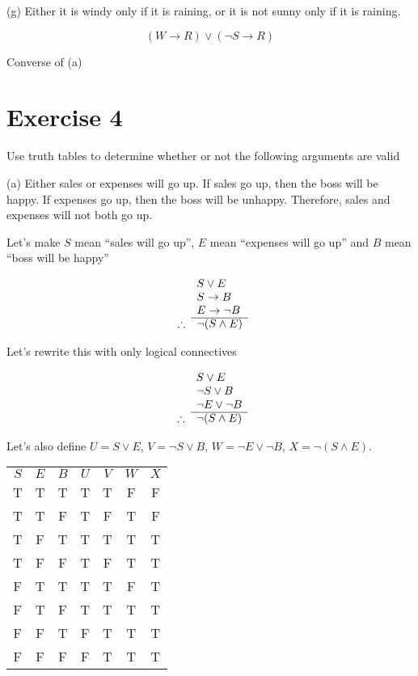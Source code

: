 \documentclass[11pt]{article}
\newcommand{\then}{\rightarrow}
\begin{document}
\noindent (g) Either it is windy only if it is raining, or it is not sunny only if it is
raining.

$$(W \then R) \vee (\neg S \then R)$$ %

Converse of (a)

\section*{Exercise 4}

\noindent Use truth tables to determine whether or not the following arguments 
are valid 

\noindent (a) Either sales or expenses will go up. If sales go up, then the boss
will be happy. If expenses go up, then the boss will be unhappy. Therefore, 
sales and expenses will not both go up.

Let's make $S$ mean ``sales will go up'', $E$ mean ``expenses will go up'' and 
$B$ mean ``boss will be happy''

\[
  \begin{array}{ r l }
               & S \vee E \\
               & S \then B \\
               & E \then \neg B \\
    \cline{2-2}
    \therefore & \neg (S \wedge E)
  \end{array}
\]

Let's rewrite this with only logical connectives

\[
  \begin{array}{ r l }
               & S \vee E \\
               & \neg S \vee B \\
               & \neg E \vee \neg B \\
    \cline{2-2}
    \therefore & \neg (S \wedge E)
  \end{array}
\]

Let's also define
$U = S \vee E$, 
$V = \neg S \vee B$,
$W = \neg E \vee \neg B$,
$X = \neg (S \wedge E)$.

\begin{center}
\begin{tabular}{ c c c c c c c }
$S$ & $E$ & $B$ & $U$ & $V$ & $W$ & $X$\\ 
T & T & T & T & T & F & F\\  
T & T & F & T & F & T & F\\
T & F & T & T & T & T & T\\  
T & F & F & T & F & T & T\\
F & T & T & T & T & F & T\\  
F & T & F & T & T & T & T\\
F & F & T & F & T & T & T\\  
F & F & F & F & T & T & T\\
\end{tabular}
\end{center}
\end{document}
